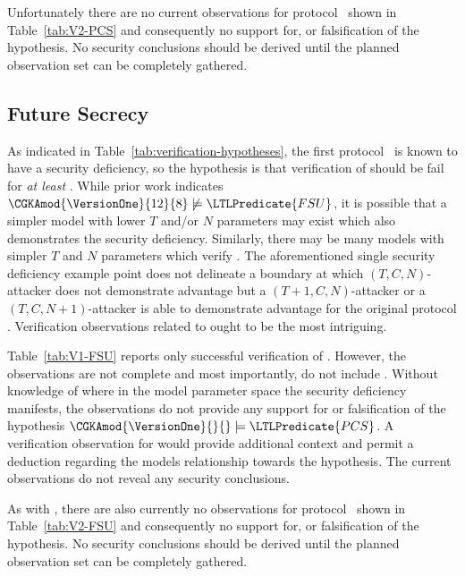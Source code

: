 Unfortunately there are no current observations for protocol \VersionTwo\ shown in Table\ \ref{tab:V2-PCS} and consequently no support for, or falsification of the hypothesis.
No security conclusions should be derived until the planned observation set can be completely gathered. 


\hypertarget{sec:future-secrecy}{%
\subsection{Future Secrecy}\label{sec:future-secrecy}}

As indicated in Table\ \ref{tab:verification-hypotheses}, the first protocol \VersionOne\ is known to have a  security deficiency, so the hypothesis is that verification of  should be fail for \emph{at least} .
While prior work \autocite{alwen2020security} indicates \( \CGKAmod{\VersionOne}{12}{8} \not \models \LTLPredicate{FSU} \), it is possible that a simpler model with lower \(T\) and/or \(N\) parameters may exist which also demonstrates the  security deficiency.
Similarly, there may be many  models with simpler \(T\) and \(N\) parameters which verify .
The aforementioned single  security deficiency example point does not delineate a boundary at which \((T, C, N)\)-attacker does not demonstrate advantage but a \((T+1, C, N)\)-attacker or a \((T, C, N+1)\)-attacker is able to demonstrate advantage for the original protocol \VersionOne.
Verification observations related to  ought to be the most intriguing.

Table\ \ref{tab:V1-FSU} reports only successful verification of .
However, the observations are not complete and most importantly, do not include .
Without knowledge of where in the  model parameter space the  security deficiency manifests, the observations do not provide any support for or falsification of the hypothesis \( \CGKAmod{\VersionOne}{}{} \models \LTLPredicate{PCS} \).
A verification observation for  would provide additional context and permit a deduction regarding the models relationship towards the hypothesis.
The current observations do not reveal any security conclusions.

As with , there are also currently no  observations for protocol \VersionTwo\ shown in Table\ \ref{tab:V2-FSU} and consequently no support for, or falsification of the hypothesis.
No security conclusions should be derived until the planned observation set can be completely gathered.
